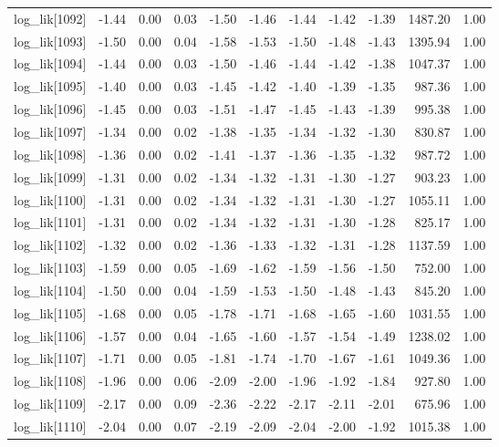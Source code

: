 \begin{table}[ht]
\begin{tabular}{rrrrrrrrrrr}
  log\_lik[1092] & -1.44 & 0.00 & 0.03 & -1.50 & -1.46 & -1.44 & -1.42 & -1.39 & 1487.20 & 1.00 \\ 
  log\_lik[1093] & -1.50 & 0.00 & 0.04 & -1.58 & -1.53 & -1.50 & -1.48 & -1.43 & 1395.94 & 1.00 \\ 
  log\_lik[1094] & -1.44 & 0.00 & 0.03 & -1.50 & -1.46 & -1.44 & -1.42 & -1.38 & 1047.37 & 1.00 \\ 
  log\_lik[1095] & -1.40 & 0.00 & 0.03 & -1.45 & -1.42 & -1.40 & -1.39 & -1.35 & 987.36 & 1.00 \\ 
  log\_lik[1096] & -1.45 & 0.00 & 0.03 & -1.51 & -1.47 & -1.45 & -1.43 & -1.39 & 995.38 & 1.00 \\ 
  log\_lik[1097] & -1.34 & 0.00 & 0.02 & -1.38 & -1.35 & -1.34 & -1.32 & -1.30 & 830.87 & 1.00 \\ 
  log\_lik[1098] & -1.36 & 0.00 & 0.02 & -1.41 & -1.37 & -1.36 & -1.35 & -1.32 & 987.72 & 1.00 \\ 
  log\_lik[1099] & -1.31 & 0.00 & 0.02 & -1.34 & -1.32 & -1.31 & -1.30 & -1.27 & 903.23 & 1.00 \\ 
  log\_lik[1100] & -1.31 & 0.00 & 0.02 & -1.34 & -1.32 & -1.31 & -1.30 & -1.27 & 1055.11 & 1.00 \\ 
  log\_lik[1101] & -1.31 & 0.00 & 0.02 & -1.34 & -1.32 & -1.31 & -1.30 & -1.28 & 825.17 & 1.00 \\ 
  log\_lik[1102] & -1.32 & 0.00 & 0.02 & -1.36 & -1.33 & -1.32 & -1.31 & -1.28 & 1137.59 & 1.00 \\ 
  log\_lik[1103] & -1.59 & 0.00 & 0.05 & -1.69 & -1.62 & -1.59 & -1.56 & -1.50 & 752.00 & 1.00 \\ 
  log\_lik[1104] & -1.50 & 0.00 & 0.04 & -1.59 & -1.53 & -1.50 & -1.48 & -1.43 & 845.20 & 1.00 \\ 
  log\_lik[1105] & -1.68 & 0.00 & 0.05 & -1.78 & -1.71 & -1.68 & -1.65 & -1.60 & 1031.55 & 1.00 \\ 
  log\_lik[1106] & -1.57 & 0.00 & 0.04 & -1.65 & -1.60 & -1.57 & -1.54 & -1.49 & 1238.02 & 1.00 \\ 
  log\_lik[1107] & -1.71 & 0.00 & 0.05 & -1.81 & -1.74 & -1.70 & -1.67 & -1.61 & 1049.36 & 1.00 \\ 
  log\_lik[1108] & -1.96 & 0.00 & 0.06 & -2.09 & -2.00 & -1.96 & -1.92 & -1.84 & 927.80 & 1.00 \\ 
  log\_lik[1109] & -2.17 & 0.00 & 0.09 & -2.36 & -2.22 & -2.17 & -2.11 & -2.01 & 675.96 & 1.00 \\ 
  log\_lik[1110] & -2.04 & 0.00 & 0.07 & -2.19 & -2.09 & -2.04 & -2.00 & -1.92 & 1015.38 & 1.00 \\ 

\end{tabular}
\end{table}
